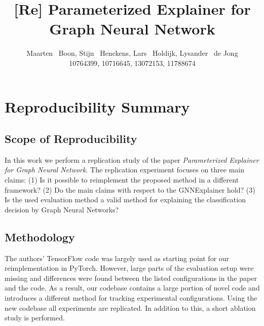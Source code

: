 \documentclass{article}
\title{[Re] Parameterized Explainer for Graph Neural Network}
\author{%
  Maarten ~Boon, Stijn ~Henckens, Lars ~Holdijk, Lysander ~de Jong \\
  10764399, 10716645, 13072153, 11788674
}
\begin{document}
\maketitle
\section*{\centering Reproducibility Summary}

\subsection*{Scope of Reproducibility}

In this work we perform a replication study of the paper \textit{Parameterized Explainer for Graph Neural Network}. The replication experiment focuses on three main claims: (1) Is it possible to reimplement the proposed method in a different framework? (2) Do the main claims with respect to the GNNExplainer hold? (3) Is the used evaluation method a valid method for explaining the classification decision by Graph Neural Networks? 

\subsection*{Methodology}

The authors' TensorFlow code was largely used as starting point for our reimplementation in PyTorch. However, large parts of the evaluation setup were missing and differences were found between the listed configurations in the paper and the code. As a result, our codebase contains a large portion of novel code and introduces a different method for tracking experimental configurations. Using the new codebase all experiments are replicated. In addition to this, a short ablation study is performed.

\end{document}
